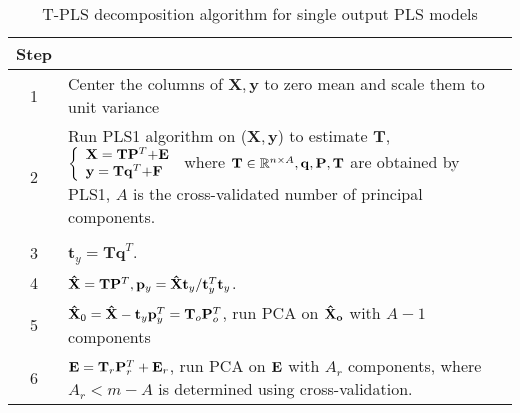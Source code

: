 \begin{table}[htbp]
  \centering
  \caption{T-PLS decomposition algorithm for single output PLS models}
  \begin{tabular}{cp{5in}}
    \toprule
    Step  & \\
    \midrule
    1 &  Center the columns of $\mathbf{X, y}$ to zero mean and scale them to unit variance \\
    2 &  Run PLS1 algorithm on ($\mathbf{X,y}$) to estimate $\mathbf T$,
     $\left\{ \begin{array}{l}
{\bf{X = T}}{{\bf{P}}^T}{\bf{ + E}}\\
{\bf{y = T}}{{\bf{q}}^T}{\bf{ + F}}
\end{array} \right.$
    where ${\bf{T}} \in {\mathbb{R}^{n \times A}},{\bf{q}},{\bf{P}},{\bf{T}}$ are obtained by PLS1, $A$ is the cross-validated number of principal components.\\
\\
    3 &  $\mathbf t_y = \mathbf{Tq}^T$. \\
    4 &  ${\bf{\hat X}} = {\bf{T}}{{\bf{P}}^T},{{\bf{p}}_y} = {\bf{\hat X}}{{\bf{t}}_y}/{\bf{t}}_y^T{{\bf{t}}_y}$.\\
     5 & ${{\bf{\hat X}}_0} = {\bf{\hat X}} - {{\bf{t}}_y}{\bf{p}}_y^T = {{\bf{T}}_o}{\bf{P}}_o^T$, run PCA on $\bf{\hat X}_o$ with $A - 1$ components\\
     6 & ${\bf{E}} = {{\bf{T}}_r}{\bf{P}}_r^T + {{\bf{E}}_r}$, run PCA on $\bf E$ with $A_r$ components, where $A_r < m - A$ is determined using cross-validation.\\
    \bottomrule
  \end{tabular}%
  \label{tab:tpls_algorithm}%
\end{table}
